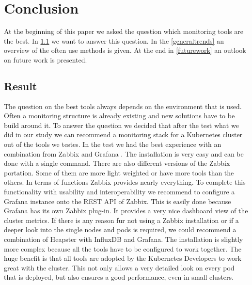 
\chapter{Conclusion}\label{chap:conclusion}
At the beginning of this paper we asked the question which monitoring tools are the best.
In \cref{result} we want to answer this question. In the \cref{generaltrends} an overview of the often use methods is given. At the end in \cref{futurework} an outlook on future work is presented. 
\section{Result}
\label{result}
The question on the best tools always depends on the environment that is used. Often a monitoring structure is already existing and new solutions have to be build around it.
To answer the question we decided that after the test what we did in our study we can recommend a monitoring stack for a Kubernetes cluster out of the tools we testes. In the test we had the best experience with an combination from Zabbix and Grafana . The installation is very easy and can be done with a single command. There are also different versions of the Zabbix portation. Some of them are more light weighted or have more tools than the others. In terms of functions Zabbix provides nearly everything. To complete this functionality with usability and interoperability we recommend to configure a Grafana instance onto the REST API of Zabbix. This is easily done because Grafana has its own Zabbix plug-in. It provides a very nice dashboard view of the cluster metrics.
If there is any reason fur not using a Zabbix installation or if a deeper look into the single nodes and pods is required, we could recommend a combination of Heapster with InfluxDB and Grafana. The installation is slightly more complex because all the tools have to be configured to work together. The huge benefit is that all tools are adopted by the Kubernetes Developers to work great with the cluster. This not only allows a very detailed look on every pod that is deployed, but also ensures a good performance, even in small clusters. 

